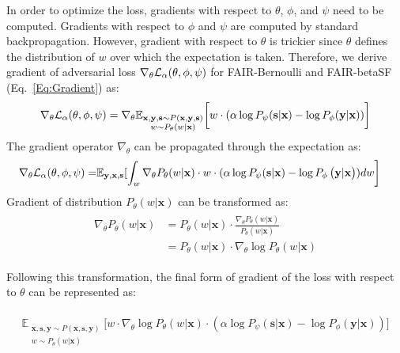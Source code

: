 \documentclass[preprint,12pt]{elsarticle}
\begin{document}
In order to optimize the loss, gradients with respect to $\theta$, $\phi$, and $\psi$ need to be computed. Gradients with respect to $\phi$ and $\psi$ are computed by standard backpropagation. However, gradient with respect to $\theta$ is trickier since $\theta$ defines the distribution of $w$ over which the expectation is taken. Therefore, we derive gradient of adversarial loss $\nabla_{\theta}{\cal L}_{\alpha}(\theta, \phi, \psi)$ for FAIR-Bernoulli and FAIR-betaSF (Eq.~\ref{Eq:Gradient}) as:
\begin{gather*}
\begin{split}
\nabla_{\theta}{\cal L}_{\alpha}(\theta, \phi, \psi) = \nabla_{\theta} \mathbb{E}_{\substack{\mathbf{x},\mathbf{y}, \mathbf{s} \sim P(\mathbf{x},\mathbf{y}, \mathbf{s})\\w \sim P_\theta(w|\mathbf{x})}} \bigg[ w \cdot ( \alpha \log P_{\psi}(\mathbf{s}|\mathbf{x}) - \log P_{\phi}(\mathbf{y}|\mathbf{x}))\bigg]
\end{split}
\end{gather*}
The gradient operator $\nabla_{\theta}$ can be propagated through the expectation as:
\begin{align*}
\begin{split}
\nabla_{\theta}{\cal L}_{\alpha}(\theta, \phi, \psi) =& \mathbb{E}_{\mathbf{y},\mathbf{x},\mathbf{s}} [ \int_w \nabla_{\theta}  P_\theta(w|\mathbf{x}) \cdot w \cdot ( \alpha \log P_{\psi}(\mathbf{s}|\mathbf{x}) - \log P_{\phi}\left(\mathbf{y}|\mathbf{x}\right))dw \bigg]
\end{split}
\end{align*}
Gradient of distribution $P_\theta(w|\mathbf{x})$ can be transformed as:
\begin{align*}
\begin{split}
\nabla_{\theta}  P_\theta(w|\mathbf{x}) &= P_\theta(w|\mathbf{x}) \cdot \frac{\nabla_{\theta}P_\theta(w|\mathbf{x}) }{ P_\theta(w|\mathbf{x})}
\\
&= P_\theta(w|\mathbf{x}) \cdot \nabla_{\theta} \log P_\theta(w|\mathbf{x})
\end{split}
\end{align*}

Following this transformation, the final form of gradient of the loss with respect to $\theta$ can be represented as:

\begin{align}
\label{Eq:Gradient}
\begin{split}
\mathbb{E}_{\substack{\mathbf{x}, \mathbf{s}, \mathbf{y}\sim P(\mathbf{x},\mathbf{s}, \mathbf{y})\\w \sim P_\theta(w|\mathbf{x})}} \Big[w\cdot \nabla_{\theta}  \log P_\theta(w|\mathbf{x}) \cdot (\alpha\log P_\psi(\mathbf{s}|\mathbf{x}) - \log P_\phi(\mathbf{y}|\mathbf{x})) \Big]
\end{split}
\end{align}
\end{document}
